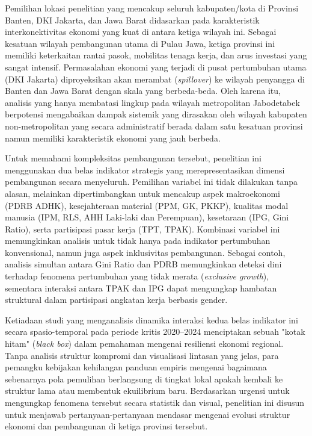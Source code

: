 \documentclass[a4paper]{article}
\theoremstyle{definition} %
\begin{document}
Pemilihan lokasi penelitian yang mencakup seluruh kabupaten/kota di Provinsi Banten, DKI Jakarta, dan Jawa Barat didasarkan pada karakteristik interkonektivitas ekonomi yang kuat di antara ketiga wilayah ini. Sebagai kesatuan wilayah pembangunan utama di Pulau Jawa, ketiga provinsi ini memiliki keterkaitan rantai pasok, mobilitas tenaga kerja, dan arus investasi yang sangat intensif. Permasalahan ekonomi yang terjadi di pusat pertumbuhan utama (DKI Jakarta) diproyeksikan akan merambat (\textit{spillover}) ke wilayah penyangga di Banten dan Jawa Barat dengan skala yang berbeda-beda. Oleh karena itu, analisis yang hanya membatasi lingkup pada wilayah metropolitan Jabodetabek berpotensi mengabaikan dampak sistemik yang dirasakan oleh wilayah kabupaten non-metropolitan yang secara administratif berada dalam satu kesatuan provinsi namun memiliki karakteristik ekonomi yang jauh berbeda.

Untuk memahami kompleksitas pembangunan tersebut, penelitian ini menggunakan dua belas indikator strategis yang merepresentasikan dimensi pembangunan secara menyeluruh. Pemilihan variabel ini tidak dilakukan tanpa alasan, melainkan dipertimbangkan untuk mencakup aspek makroekonomi (PDRB ADHK), kesejahteraan material (PPM, GK, PKKP), kualitas modal manusia (IPM, RLS, AHH Laki-laki dan Perempuan), kesetaraan (IPG, Gini Ratio), serta partisipasi pasar kerja (TPT, TPAK). Kombinasi variabel ini memungkinkan analisis untuk tidak hanya pada indikator pertumbuhan konvensional, namun juga aspek inklusivitas pembangunan. Sebagai contoh, analisis simultan antara Gini Ratio dan PDRB memungkinkan deteksi dini terhadap fenomena pertumbuhan yang tidak merata (\textit{exclusive growth}), sementara interaksi antara TPAK dan IPG dapat mengungkap hambatan struktural dalam partisipasi angkatan kerja berbasis gender.

Ketiadaan studi yang menganalisis dinamika interaksi kedua belas indikator ini secara spasio-temporal pada periode kritis 2020--2024 menciptakan sebuah "kotak hitam" (\textit{black box}) dalam pemahaman mengenai resiliensi ekonomi regional. Tanpa analisis struktur kompromi dan visualisasi lintasan yang jelas, para pemangku kebijakan kehilangan panduan empiris mengenai bagaimana sebenarnya pola pemulihan berlangsung di tingkat lokal apakah kembali ke struktur lama atau membentuk ekuilibrium baru. Berdasarkan urgensi untuk mengungkap fenomena tersebut secara statistik dan visual, penelitian ini disusun untuk menjawab pertanyaan-pertanyaan mendasar mengenai evolusi struktur ekonomi dan pembangunan di ketiga provinsi tersebut.
\end{document}
